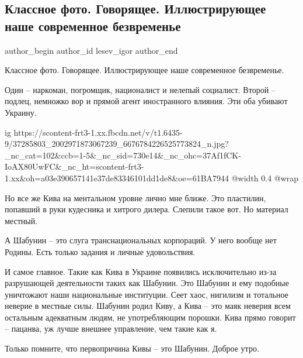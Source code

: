  
 
 
 
 
 
\subsection{Классное фото. Говорящее. Иллюстрирующее наше современное безвременье}
\label{sec:18_07_2018.fb.lesev_igor.1.kiva_shabunin_foto}
 
\ifcmt
 author_begin
   author_id lesev_igor
 author_end
\fi

Классное фото. Говорящее. Иллюстрирующее наше современное безвременье.

Один – наркоман, погромщик, националист и нелепый социалист. Второй – подлец,
немножко вор и прямой агент иностранного влияния. Эти оба убивают Украину.

\ifcmt
  ig https://scontent-frt3-1.xx.fbcdn.net/v/t1.6435-9/37285803_2002971873067239_6676784226525773824_n.jpg?_nc_cat=102&ccb=1-5&_nc_sid=730e14&_nc_ohc=37Af1fCK-IoAX80UwFC&_nc_ht=scontent-frt3-1.xx&oh=a03e390657141e37de83346101dd1de8&oe=61BA7944
  @width 0.4
  @wrap 
\fi

Но все же Кива на ментальном уровне лично мне ближе. Это пластилин, попавший в
руки кудесника и хитрого дилера. Слепили такое вот. Но материал местный.

А Шабунин – это слуга транснациональных корпораций. У него вообще нет Родины.
Есть только задания и личные удовольствия.

И самое главное. Такие как Кива в Украине появились исключительно из-за
разрушающей деятельности таких как Шабунин. Это Шабунин и ему подобные
уничтожают наши национальные институции. Сеет хаос, нигилизм и тотальное
неверие в местные силы. Шабунин родил Киву, а Кива – это маяк неверия всем
остальным адекватным людям, не употребляющим порошки. Кива прямо говорит –
пацанва, уж лучше внешнее управление, чем такие как я.

Только помните, что первопричина Кивы – это Шабунин. Доброе утро.

